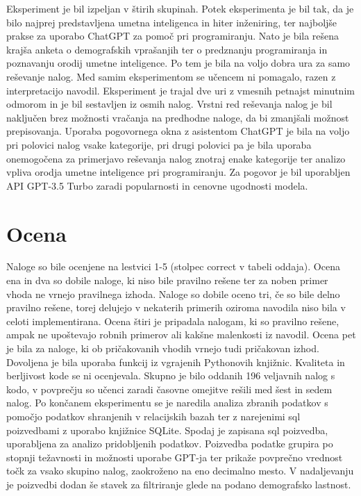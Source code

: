 \documentclass[a4paper,12pt,openright]{book}
\begin{document}
Eksperiment je bil izpeljan v štirih skupinah. Potek eksperimenta je bil tak, da je bilo najprej predstavljena umetna inteligenca in hiter inženiring, ter najboljše prakse za uporabo ChatGPT za pomoč pri programiranju. Nato je bila rešena krajša anketa o demografskih vprašanjih ter o predznanju programiranja in poznavanju orodij umetne inteligence. Po tem je bila na voljo dobra ura za samo reševanje nalog. Med samim eksperimentom se učencem ni pomagalo, razen z interpretacijo navodil.
Eksperiment je trajal dve uri z vmesnih petnajst minutnim odmorom in je bil sestavljen iz osmih nalog. Vrstni red reševanja nalog je bil naključen brez možnosti vračanja na predhodne naloge, da bi zmanjšali možnost prepisovanja. Uporaba pogovornega okna z asistentom ChatGPT je bila na voljo pri polovici nalog vsake kategorije, pri drugi polovici pa je bila uporaba onemogočena za primerjavo reševanja nalog znotraj enake kategorije ter analizo vpliva orodja umetne inteligence pri programiranju. Za pogovor je bil uporabljen API GPT-3.5 Turbo zaradi popularnosti in cenovne ugodnosti modela.

\section{Ocena}
Naloge so bile ocenjene na lestvici 1-5 (stolpec correct v tabeli oddaja). Ocena ena in dva so dobile naloge, ki niso bile pravilno rešene ter za noben primer vhoda ne vrnejo pravilnega izhoda. Naloge so dobile oceno tri, če so bile delno pravilno rešene, torej delujejo v nekaterih primerih oziroma navodila niso bila v celoti implementirana. Ocena štiri je pripadala nalogam, ki so pravilno rešene, ampak ne upoštevajo robnih primerov ali kakšne malenkosti iz navodil. Ocena pet je bila za naloge, ki ob pričakovanih vhodih vrnejo tudi pričakovan izhod. Dovoljena je bila uporaba funkcij iz vgrajenih Pythonovih knjižnic. Kvaliteta in berljivost kode se ni ocenjevala. Skupno je bilo oddanih 196 veljavnih nalog s kodo, v povprečju so učenci zaradi časovne omejitve rešili med šest in sedem nalog. 
Po končanem eksperimentu se je naredila analiza zbranih podatkov s pomočjo podatkov shranjenih v relacijskih bazah ter z narejenimi sql poizvedbami z uporabo knjižnice SQLite.
Spodaj je zapisana sql poizvedba, uporabljena za analizo pridobljenih podatkov. Poizvedba podatke grupira po stopnji težavnosti in možnosti uporabe GPT-ja ter prikaže povprečno vrednost točk za vsako skupino nalog, zaokroženo na eno decimalno mesto. V nadaljevanju je poizvedbi dodan še stavek za filtriranje glede na podano demografsko lastnost.
\end{document}

